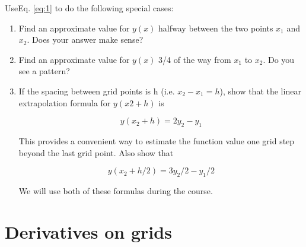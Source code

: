     \begin{problem} \label{P1.3} UseEq. \eqref{eq:1} to do the following special cases:
     
     \begin{enumerate}[label=(\alph*)]
     
     	\item Find an approximate value for $y(x)$ halfway between the two points $x_1$ and $x_2$. Does your answer make sense?
     	
     	\item Find an approximate value for $y(x)$ 3/4 of the way from $x_1$ to $x_2$. Do you see a pattern?
     	
     
     	\item If the spacing between grid points is h (i.e. $x_2 − x_1 = h$), show that the linear extrapolation formula for $y(x2+h)$ is
     	
     	\begin{equation} \label{eq:2}
     		y(x_2 + h) = 2y_2 - y_1
     	\end{equation}
     	
     	This provides a convenient way to estimate the function value one grid step beyond the last grid point. Also show that
     	
     	\begin{equation} \label{eq:3}
     		y(x_2 + h/2) = 3y_2/2 - y_1/2
     	\end{equation}
     	
     	We will use both of these formulas during the course.
     	
     \end{enumerate}
    \end{problem}
     \section*{Derivatives on grids}
     
